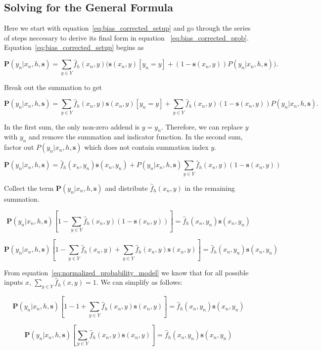 \documentclass[twoside]{article}
\begin{document}
\begin{appendices}

\section{Solving for the General Formula}
\label{appendix:solving}

Here we start with equation~\eqref{eq:bias_corrected_setup} and go through the series of steps neccesary to derive its final form in equation ~\eqref{eq:bias_corrected_prob}. Equation~\eqref{eq:bias_corrected_setup} begins as

\[\mathbf{P}(y_n|x_n,h,\mathbf{s})=\sum_{y \in Y}\hat{f}_h(x_n,y)\big(\mathbf{s}(x_n,y)\left [y_n = y\right ] + (1-\mathbf{s}(x_n,y))P(y_n|x_n,h,\mathbf{s})\big).\]

Break out the summation to get

\[\mathbf{P}(y_n|x_n,h,\mathbf{s})=\sum_{y \in Y}\hat{f}_h(x_n,y)\mathbf{s}(x_n,y)\left [y_n = y\right ] +\sum_{y \in Y}\hat{f}_h(x_n,y)(1-\mathbf{s}(x_n,y))P(y_n|x_n,h,\mathbf{s}).\]

In the first sum, the only non-zero addend is \(y = y_n\). Therefore, we can replace \(y\) with \(y_n\) and remove the summation and indicator function. In the second sum, factor out \(P(y_n|x_n,h,\mathbf{s})\) which does not contain summation index \(y\).

\[\mathbf{P}(y_n|x_n,h,\mathbf{s})=\hat{f}_h(x_n,y_n)\mathbf{s}(x_n,y_n) +P(y_n|x_n,h,\mathbf{s})\sum_{y \in Y}\hat{f}_h(x_n,y)(1-\mathbf{s}(x_n,y))\]

Collect the term \(\mathbf{P}(y_n|x_n,h,\mathbf{s})\) and distribute \(\hat{f}_h(x_n,y)\) in the remaining summation.

\[\mathbf{P}(y_n|x_n,h,\mathbf{s})\left [ 1 - \sum_{y \in Y}\hat{f}_h(x_n,y)(1-\mathbf{s}(x_n,y)) \right ]=\hat{f}_h(x_n,y_n)\mathbf{s}(x_n,y_n) \]

\[\mathbf{P}(y_n|x_n,h,\mathbf{s})\left [ 1 - \sum_{y \in Y}\hat{f}_h(x_n,y)+\sum_{y \in Y}\hat{f}_h(x_n,y)\mathbf{s}(x_n,y) \right ]=\hat{f}_h(x_n,y_n)\mathbf{s}(x_n,y_n) \]

From equation~\eqref{eq:normalized_probability_model} we know that for all possible inputs \(x\), \(\sum_{y \in Y} \hat{f}_h(x, y) = 1\). We can simplify as follows:

\[\mathbf{P}(y_n|x_n,h,\mathbf{s})\left [ 1 - 1+\sum_{y \in Y}\hat{f}_h(x_n,y)\mathbf{s}(x_n,y) \right ]=\hat{f}_h(x_n,y_n)\mathbf{s}(x_n,y_n) \]

\[\mathbf{P}(y_n|x_n,h,\mathbf{s})\left [\sum_{y \in Y}\hat{f}_h(x_n,y)\mathbf{s}(x_n,y) \right ]=\hat{f}_h(x_n,y_n)\mathbf{s}(x_n,y_n) \]


\end{appendices}
\end{document}

